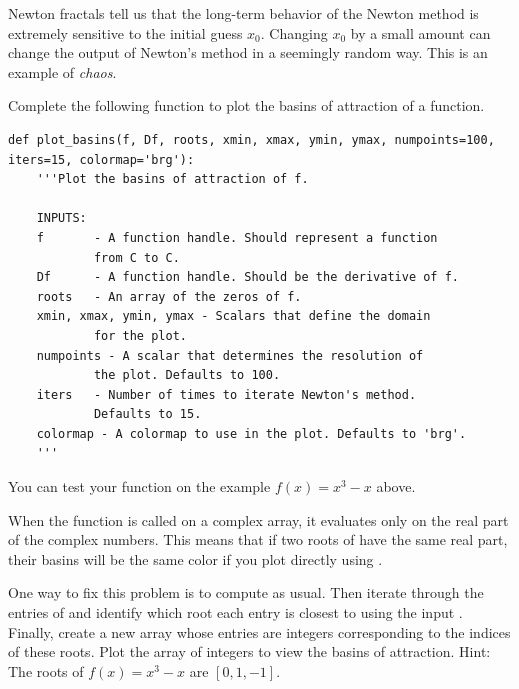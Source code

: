Newton fractals tell us that the long-term behavior of the Newton method is extremely sensitive to the initial guess $x_0$.
Changing $x_0$ by a small amount can change the output of Newton's method in a seemingly random way.
This is an example of \emph{chaos}.

\begin{problem}
\leavevmode

Complete the following function to plot the basins of attraction of a function.
\begin{lstlisting}
def plot_basins(f, Df, roots, xmin, xmax, ymin, ymax, numpoints=100, iters=15, colormap='brg'):
    '''Plot the basins of attraction of f.

    INPUTS:
    f       - A function handle. Should represent a function
            from C to C.
    Df      - A function handle. Should be the derivative of f.
    roots   - An array of the zeros of f.
    xmin, xmax, ymin, ymax - Scalars that define the domain
            for the plot.
    numpoints - A scalar that determines the resolution of
            the plot. Defaults to 100.
    iters   - Number of times to iterate Newton's method.
            Defaults to 15.
    colormap - A colormap to use in the plot. Defaults to 'brg'.
    '''
\end{lstlisting}
You can test your function on the example $f(x) = x^3-x$ above.

When the function  is called on a complex array, it evaluates only on the real part of the complex numbers.
This means that if two roots of  have the same real part, their basins will be the same color if you plot directly using .

One way to fix this problem is to compute  as usual.
Then iterate through the entries of  and identify which root each entry is closest to using the input .
Finally, create a new array whose entries are integers corresponding to the indices of these roots.
Plot the array of integers to view the basins of attraction.  Hint: The roots of $f(x) = x^3-x$ are $[0,1,-1]$.
\end{problem}

